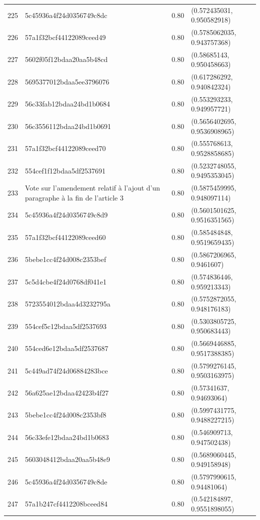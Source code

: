 \begin{table}[ht]
\begin{tabular}{rlrl}
  225 & 5c45936a4f24d0356749c8dc & 0.80 & (0.572435031, 0.950582918) \\ 
  226 & 57a1f32bcf44122089ceed49 & 0.80 & (0.5785062035, 0.943757368) \\ 
  227 & 5602f05f12bdaa20aa5b48cd & 0.80 & (0.58685143, 0.950458663) \\ 
  228 & 5695377012bdaa5ee3796076 & 0.80 & (0.617286292, 0.940842324) \\ 
  229 & 56c33fab12bdaa24bd1b0684 & 0.80 & (0.553293233, 0.949957721) \\ 
  230 & 56c3556112bdaa24bd1b0691 & 0.80 & (0.5656402695, 0.9536908965) \\ 
  231 & 57a1f32bcf44122089ceed70 & 0.80 & (0.555768613, 0.9528858685) \\ 
  232 & 554cef1f12bdaa5df2537691 & 0.80 & (0.5232748055, 0.9495353045) \\ 
  233 & Vote sur l'amendement relatif à l'ajout d'un paragraphe à la fin de l'article 3 & 0.80 & (0.5875459995, 0.948097114) \\ 
  234 & 5c45936a4f24d0356749c8d9 & 0.80 & (0.5601501625, 0.9516351565) \\ 
  235 & 57a1f32bcf44122089ceed60 & 0.80 & (0.585484848, 0.9519659435) \\ 
  236 & 5bebe1cc4f24d008c2353bef & 0.80 & (0.5867206965, 0.9461607) \\ 
  237 & 5c5d4cbe4f24d0768df041e1 & 0.80 & (0.574836446, 0.959213343) \\ 
  238 & 5723554012bdaa4d3232795a & 0.80 & (0.5752872055, 0.948176183) \\ 
  239 & 554cef5c12bdaa5df2537693 & 0.80 & (0.5303805725, 0.950683443) \\ 
  240 & 554ced6e12bdaa5df2537687 & 0.80 & (0.5669446885, 0.9517388385) \\ 
  241 & 5c449ad74f24d06884283bce & 0.80 & (0.5799276145, 0.9503163975) \\ 
  242 & 56a625ae12bdaa42423b4f27 & 0.80 & (0.57341637, 0.94693064) \\ 
  243 & 5bebe1cc4f24d008c2353bf8 & 0.80 & (0.5997431775, 0.9488227215) \\ 
  244 & 56c33efe12bdaa24bd1b0683 & 0.80 & (0.546909713, 0.947502438) \\ 
  245 & 5603048412bdaa20aa5b48e9 & 0.80 & (0.5689060445, 0.949158948) \\ 
  246 & 5c45936a4f24d0356749c8de & 0.80 & (0.5797990615, 0.94481064) \\ 
  247 & 57a1b247cf4412208bceed84 & 0.80 & (0.542184897, 0.9551898055) \\ 

\end{tabular}
\end{table}
